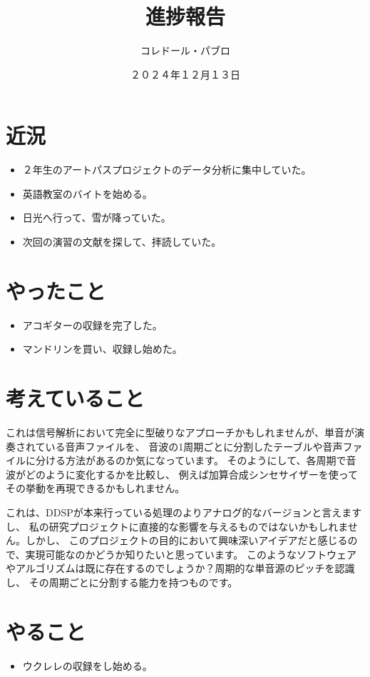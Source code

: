 \documentclass[a4paper, 12pt]{article}
\title{進捗報告}
\author{コレドール・パブロ}
\date{２０２４年１２月１３日}
\begin{document}
\maketitle

\section*{近況}
\begin{itemize}
    \item ２年生のアートパスプロジェクトのデータ分析に集中していた。
    \item 英語教室のバイトを始める。
    \item 日光へ行って、雪が降っていた。
    \item 次回の演習の文献を探して、拝読していた。\cite{roomGAN}
\end{itemize} 

\section*{やったこと}
\begin{itemize}
    \item アコギターの収録を完了した。
    \item マンドリンを買い、収録し始めた。
\end{itemize}

\section*{考えていること}

これは信号解析において完全に型破りなアプローチかもしれませんが、単音が演奏されている音声ファイルを、
音波の1周期ごとに分割したテーブルや音声ファイルに分ける方法があるのか気になっています。
そのようにして、各周期で音波がどのように変化するかを比較し、
例えば加算合成シンセサイザーを使ってその挙動を再現できるかもしれません。

これは、DDSPが本来行っている処理のよりアナログ的なバージョンと言えますし、
私の研究プロジェクトに直接的な影響を与えるものではないかもしれません。しかし、
このプロジェクトの目的において興味深いアイデアだと感じるので、実現可能なのかどうか知りたいと思っています。
このようなソフトウェアやアルゴリズムは既に存在するのでしょうか？周期的な単音源のピッチを認識し、
その周期ごとに分割する能力を持つものです。

\section*{やること}
\begin{itemize}
    \item ウクレレの収録をし始める。
\end{itemize}



\end{document}
